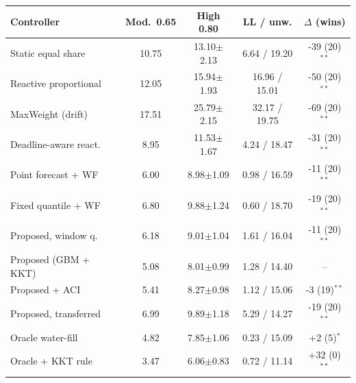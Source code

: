 \begin{tabular}{lcccc}
\hline
Controller & Mod.\ 0.65 & High 0.80 & LL / unw. & $\Delta$ (wins) \\
\hline
Static equal share & 10.75 & 13.10$\pm$2.13 & 6.64 / 19.20 & -39 (20)$^{\ast\ast}$ \\
Reactive proportional & 12.05 & 15.94$\pm$1.93 & 16.96 / 15.01 & -50 (20)$^{\ast\ast}$ \\
MaxWeight (drift) & 17.51 & 25.79$\pm$2.15 & 32.17 / 19.75 & -69 (20)$^{\ast\ast}$ \\
Deadline-aware react. & 8.95 & 11.53$\pm$1.67 & 4.24 / 18.47 & -31 (20)$^{\ast\ast}$ \\
Point forecast + WF & 6.00 & 8.98$\pm$1.09 & 0.98 / 16.59 & -11 (20)$^{\ast\ast}$ \\
Fixed quantile + WF & 6.80 & 9.88$\pm$1.24 & 0.60 / 18.70 & -19 (20)$^{\ast\ast}$ \\
Proposed, window q. & 6.18 & 9.01$\pm$1.04 & 1.61 / 16.04 & -11 (20)$^{\ast\ast}$ \\
Proposed (GBM + KKT) & 5.08 & 8.01$\pm$0.99 & 1.28 / 14.40 & -- \\
Proposed + ACI & 5.41 & 8.27$\pm$0.98 & 1.12 / 15.06 & -3 (19)$^{\ast\ast}$ \\
Proposed, transferred & 6.99 & 9.89$\pm$1.18 & 5.29 / 14.27 & -19 (20)$^{\ast\ast}$ \\
\hline
Oracle water-fill & 4.82 & 7.85$\pm$1.06 & 0.23 / 15.09 & +2 (5)$^{\ast}$ \\
Oracle + KKT rule & 3.47 & 6.06$\pm$0.83 & 0.72 / 11.14 & +32 (0)$^{\ast\ast}$ \\
\hline
\end{tabular}
